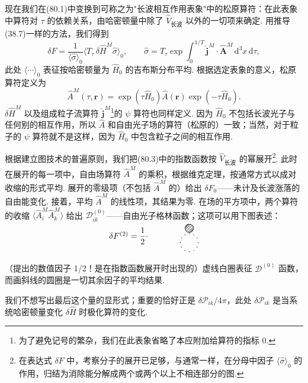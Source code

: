 现在我们在(80.1)中变换到可称之为"长波相互作用表象"中的松原算符：在此表象中算符对 $\tau$ 的依赖关系，由哈密顿量中除了 $\hat{V}_{\text{长波}}$ 以外的一切项来确定. 用推导(38.7)一样的方法，我们得到
\begin{equation}
  \delta F=\frac{1}{\langle\hat{\sigma}\rangle_0}\bigl\langle T_{\tau}\,\delta\hat{H}^{M}\hat{\sigma}\bigr\rangle_0,\qquad \hat{\sigma}=T_{\tau}\exp\int_{0}^{1/T}\hat{\bm{j}}^{M}\cdot\hat{\bm{A}}^{M}\,\mathrm{d}^{3}x\,\mathrm{d}\tau,
\end{equation}
此处 $\langle\cdots\rangle_0$ 表征按哈密顿量为 $\hat{H}_0$ 的吉布斯分布平均. 根据选定表象的意义，松原算符定义为
\begin{equation}
  \hat{A}^{M}(\tau,\bm{r})=\exp(\tau\hat{H}_0)\hat{A}(\bm{r})\exp(-\tau\hat{H}_0).
\end{equation}
$\delta\hat{H}^{M}$ 以及组成粒子流算符 $\hat{\bm{j}}^{M}$\footnote{为了避免记号的繁杂，我们在此表象省略了本应附加给算符的指标 $0$.}的 $\psi$ 算符也同样定义. 因为 $\hat{H}_0$ 不包括长波光子与任何别的相互作用，所以 $\hat{A}$ 和自由光子场的算符（松原的）一致；当然，对于粒子的 $\psi$ 算符就不是这样，因为 $\hat{H}_0$ 中包含粒子之间的相互作用.

根据建立图技术的普遍原则，我们把(80.3)中的指数函数按 $\hat{V}_{\text{长波}}$ 的幂展开\footnote{在表达式 $\delta F$ 中，考察分子的展开已足够，与通常一样，在分母中因子 $\langle\hat{\sigma}\rangle_0$ 的作用，归结为消除能分解成两个或两个以上不相连部分的图.}. 此时在展开的每一项中，自由场算符 $\hat{A}^{M}$ 的乘积，根据维克定理，按通常方式以成对收缩的形式平均. 展开的零级项（不包括 $\hat{A}^{M}$ 的）给出 $\delta F_0$——未计及长波涨落的自由能变化. 接着，平均 $\hat{A}^{M}$ 的线性项，其结果为零. 在场的平方项中，两个算符的收缩 $\langle\hat{A}_i^{M}\hat{A}_k^{M}\rangle$ 给出 $\mathcal{D}^{(0)}_{ik}$——自由光子格林函数；这项可以用下图表述：
\begin{equation}
  \setlength{\unitlength}{0.72pt}%
  \begin{picture}(105,46)(-112,-19)
    \put(-102,11){\makebox(0,0){$\delta F^{(2)}=\dfrac{1}{2}\cdot$}}%
    {\thinlines\dashC}%
    {\put(0,24){\hatchC}}%
  \end{picture}
\end{equation}
（提出的数值因子 1/2！是在指数函数展开时出现的）虚线白圈表征 $\mathcal{D}^{(0)}$ 函数，而画斜线的圆圈是一切其余因子的平均结果.

我们不想写出最后这个量的显形式；重要的恰好正是 $\delta\mathcal{P}_{ik}/4\pi$，此处 $\delta\mathcal{P}_{ik}$ 是当系统哈密顿量变化 $\delta\hat{H}$ 时极化算符的变化.

